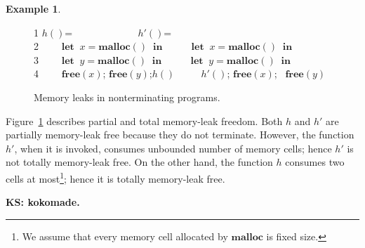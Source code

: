 \documentclass[english]{jssst_ppl} %
\newcommand\LET{\mathbf{let}\;}
\newcommand\IN{\mathbf{in}\;}
\newcommand\Rtab{\; \; \; \;}
\newcommand\MALLOC{\mathbf{malloc()}\;}
\newcommand\Malloc{\mathbf{malloc}}
\newcommand\Free{\mathbf{free}}
\newcommand\Cirx{(x)}
\newcommand\dtb{\;\;\ \;\;\ \;\;\ \;\;\  }
\theoremstyle{definition}
\newtheorem{exmp}{Example}[section]
\newcommand\todo[1]{{\bf KS: {#1}}}
\begin{document}
\begin{exmp}\label{ex:ex1}
\begin{figure}[h]
1  \Rtab $h()$= \dtb \dtb\dtb\Rtab$h'()$= \\
2  \dtb $\LET \; x = \MALLOC  \; \IN$ \dtb \Rtab$\LET \; x = \MALLOC  \; \IN$\\
3  \dtb $\LET \; y = \MALLOC  \; \IN$ \dtb \Rtab$\LET \; y = \MALLOC  \; \IN$\\
4  \dtb $\Free(x)$; $\Free(y) $;\;$h()$ \dtb \Rtab$h'()$; $\Free\Cirx$; \ $\Free(y)$
\caption{Memory leaks in nonterminating programs.}
\label{ex:np}
\end{figure}
Figure~\ref{ex:np} describes partial and total memory-leak freedom.
Both \(h\) and \(h'\) are partially memory-leak free because they do
not terminate.  However, the function \(h'\), when it is invoked,
consumes unbounded number of memory cells; hence \(h'\) is not totally
memory-leak free.  On the other hand, the function \(h\) consumes two
cells at most\footnote{We assume that every memory cell allocated by
  \(\Malloc\) is fixed size.}; hence it is totally memory-leak free.
\end{exmp}

\todo{kokomade.}


\end{document}

